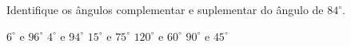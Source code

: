 Identifique os ângulos complementar e suplementar do ângulo de $84^\circ$.

$6^\circ$ e $96^\circ$
$4^\circ$ e $94^\circ$
$15^\circ$ e $75^\circ$
$120^\circ$ e $60^\circ$
$90^\circ$ e $45^\circ$




